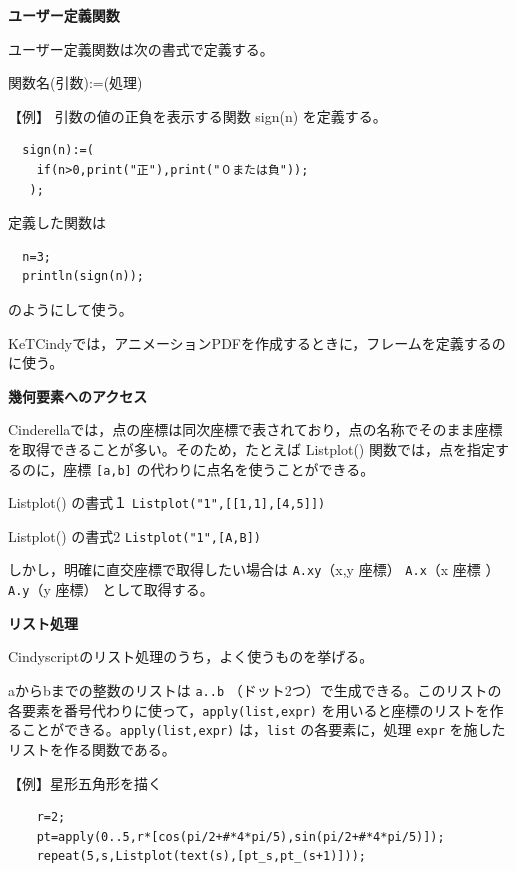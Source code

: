 \documentclass[papersize,a4paper,12pt,uplatex]{jsarticle}
\begin{document}
\vspace{\baselineskip}\noindent
{\bf ユーザー定義関数}

ユーザー定義関数は次の書式で定義する。

\hspace{10mm}関数名(引数):=(処理)

\vspace{\baselineskip}
【例】  引数の値の正負を表示する関数 sign(n) を定義する。
\begin{verbatim}
  sign(n):=(
    if(n>0,print("正"),print("０または負"));
   );
\end{verbatim}
定義した関数は
\begin{verbatim}
  n=3;
  println(sign(n));
\end{verbatim}
のようにして使う。

KeTCindyでは，アニメーションPDFを作成するときに，フレームを定義するのに使う。

\vspace{\baselineskip}\noindent
{\bf 幾何要素へのアクセス}

Cinderellaでは，点の座標は同次座標で表されており，点の名称でそのまま座標を取得できることが多い。そのため，たとえば Listplot() 関数では，点を指定するのに，座標 \verb|[a,b]| の代わりに点名を使うことができる。

\vspace{\baselineskip}
Listplot() の書式１  \verb|Listplot("1",[[1,1],[4,5]])|

Listplot() の書式2  \verb|Listplot("1",[A,B])|

\vspace{\baselineskip}

しかし，明確に直交座標で取得したい場合は  \verb|A.xy|（x,y 座標）  \verb|A.x|（x 座標 ）   \verb|A.y|（y 座標）  として取得する。

\vspace{\baselineskip}\noindent
{\bf リスト処理}

Cindyscriptのリスト処理のうち，よく使うものを挙げる。

aからbまでの整数のリストは \verb|a..b| （ドット2つ）で生成できる。このリストの各要素を番号代わりに使って，\verb|apply(list,expr)| を用いると座標のリストを作ることができる。\verb|apply(list,expr)| は，\verb|list| の各要素に，処理 \verb|expr| を施したリストを作る関数である。

\vspace{\baselineskip}
【例】星形五角形を描く
\begin{verbatim}
    r=2;
    pt=apply(0..5,r*[cos(pi/2+#*4*pi/5),sin(pi/2+#*4*pi/5)]);
    repeat(5,s,Listplot(text(s),[pt_s,pt_(s+1)]));
\end{verbatim}
\end{document}
